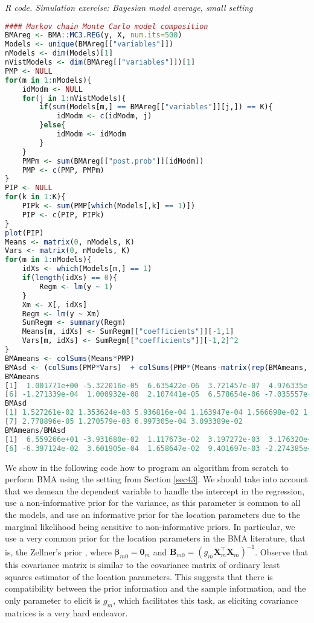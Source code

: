 \begin{tcolorbox}[enhanced,width=4.67in,center upper,
	fontupper=\large\bfseries,drop shadow southwest,sharp corners]
	\textit{R code. Simulation exercise: Bayesian model average, small setting}
	\begin{VF}
		\begin{lstlisting}[language=R]
#### Markov chain Monte Carlo model composition
BMAreg <- BMA::MC3.REG(y, X, num.its=500)
Models <- unique(BMAreg[["variables"]])
nModels <- dim(Models)[1]
nVistModels <- dim(BMAreg[["variables"]])[1]
PMP <- NULL
for(m in 1:nModels){
	idModm <- NULL
	for(j in 1:nVistModels){
		if(sum(Models[m,] == BMAreg[["variables"]][j,]) == K){
			idModm <- c(idModm, j)
		}else{
			idModm <- idModm
		} 
	}
	PMPm <- sum(BMAreg[["post.prob"]][idModm])
	PMP <- c(PMP, PMPm)
}
PIP <- NULL
for(k in 1:K){
	PIPk <- sum(PMP[which(Models[,k] == 1)])
	PIP <- c(PIP, PIPk)
}
plot(PIP)
Means <- matrix(0, nModels, K)
Vars <- matrix(0, nModels, K)
for(m in 1:nModels){
	idXs <- which(Models[m,] == 1)
	if(length(idXs) == 0){
		Regm <- lm(y ~ 1)
	}
	Xm <- X[, idXs]
	Regm <- lm(y ~ Xm)
	SumRegm <- summary(Regm)
	Means[m, idXs] <- SumRegm[["coefficients"]][-1,1]
	Vars[m, idXs] <- SumRegm[["coefficients"]][-1,2]^2 
}
BMAmeans <- colSums(Means*PMP)
BMAsd <- (colSums(PMP*Vars)  + colSums(PMP*(Means-matrix(rep(BMAmeans, each = nModels), nModels, K))^2))^0.5
BMAmeans
[1]  1.001771e+00 -5.322016e-05  6.635422e-06  3.721457e-07  4.976335e-01
[6] -1.271339e-04  1.000932e-08  2.107441e-05  6.578654e-06 -7.035557e-01 
BMAsd
[1] 1.527261e-02 1.353624e-03 5.936816e-04 1.163947e-04 1.566698e-02 1.987360e-03
[7] 2.778896e-05 1.270579e-03 6.997305e-04 3.093389e-02
BMAmeans/BMAsd
[1]  6.559266e+01 -3.931680e-02  1.117673e-02  3.197272e-03  3.176320e+01
[6] -6.397124e-02  3.601905e-04  1.658647e-02  9.401697e-03 -2.274385e+01
\end{lstlisting}
	\end{VF}
\end{tcolorbox}

We show in the following code how to program an algorithm from scratch to perform BMA using the setting from Section \ref{sec43}. We should take into account that we demean the dependent variable to handle the intercept in the regression, use a non-informative prior for the variance, as this parameter is common to all the models, and use an informative prior for the location parameters due to the marginal likelihood being sensitive to non-informative priors. In particular, we use a very common prior for the location parameters in the BMA literature, that is, the Zellner's prior \cite{zellner1986assessing}, where $\bm{\beta}_{m0}=\bm{0}_m$ and $\bm{B}_{m0}=(g_m\bm{X}_m^{\top}\bm{X}_m)^{-1}$. Observe that this covariance matrix is similar to the covariance matrix of ordinary least squares estimator of the location parameters. This suggests that there is compatibility between the prior information and the sample information, and the only parameter to elicit is $g_m$, which facilitates this task, as eliciting covariance matrices is a very hard endeavor.  



